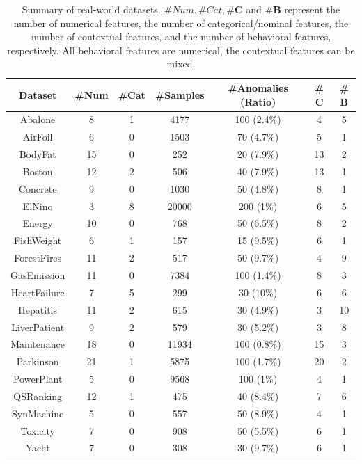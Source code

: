 \documentclass[pdflatex,sn-basic]{sn-jnl}%
\theoremstyle{thmstyleone}%
\theoremstyle{thmstyletwo}%
\theoremstyle{thmstylethree}%
\begin{document}
\begin{table}[!htbp]
	\caption{Summary of real-world datasets. $\#Num, \#Cat, \#\mathbf{C}$ and $\#\mathbf{B}$ represent the number of numerical features, the number of categorical/nominal features, the number of contextual features, and the number of behavioral features, respectively. All behavioral features are numerical, the contextual features can be mixed.}
	\centering
	\begin{tabular}{ccccccc}
		\toprule
		Dataset  & \#Num    & \#Cat  & \#Samples & \#Anomalies (Ratio) & \#$\mathbf{C}$  & \#$\mathbf{B}$  \\
		\midrule
		Abalone & 8 & 1  & 4177 & 100 (2.4\%) & 4 & 5  \\
		AirFoil & 6 & 0  & 1503 & 70 (4.7\%) & 5 & 1  \\
		BodyFat  & 15 &  0  & 252 & 20 (7.9\%)  & 13 & 2   \\
		Boston & 12 &  2  & 506 & 40 (7.9\%)  & 13 & 1   \\
		Concrete & 9 & 0  & 1030 & 50 (4.8\%) & 8 & 1  \\
		ElNino & 3 & 8  & 20000 & 200 (1\%) & 6 & 5 \\
		Energy  & 10 & 0 & 768 & 50 (6.5\%) & 8 & 2  \\	
		FishWeight & 6 & 1  & 157 & 15 (9.5\%) & 6 & 1  \\
		ForestFires  & 11 & 2 & 517 & 50 (9.7\%) & 4 & 9  \\
		GasEmission & 11 & 0 & 7384 & 100 (1.4\%) & 8 & 3  \\
		HeartFailure  & 7 & 5 & 299 & 30 (10\%) & 6 & 6  \\
		Hepatitis  & 11 & 2 & 615 & 30 (4.9\%) & 3 & 10  \\
		LiverPatient  & 9 & 2 & 579 & 30 (5.2\%) & 3 & 8  \\
		Maintenance & 18 & 0 & 11934 & 100 (0.8\%) & 15 & 3  \\
		Parkinson & 21 & 1 & 5875 & 100 (1.7\%) & 20 & 2 \\
        PowerPlant & 5 & 0  & 9568 & 100 (1\%) & 4 & 1  \\
		QSRanking & 12 & 1 & 475 & 40 (8.4\%) & 7 & 6  \\
		SynMachine  & 5 & 0 & 557 & 50 (8.9\%) & 4 & 1  \\
		Toxicity & 7 & 0  & 908 & 50 (5.5\%) & 6 & 1  \\
		Yacht & 7 & 0  & 308 & 30 (9.7\%) & 6 & 1  \\
		\bottomrule
	\end{tabular}
	\label{tab:data_summary2}
\end{table}
\end{document}
